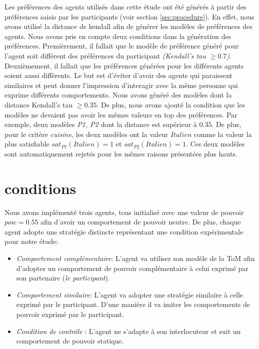 	Les préférences des agents utilisés dans cette étude ont été générés à partir des préférences saisis par les participants (voir section \ref{sec:procedure}). 
	En effet, nous avons utilisé la distance de kendall \cite{bra2013Kendall} afin de générer les modèles de préférences des agents. Nous avons pris en compte deux conditions dans la génération des préférences. Premièrement, il fallait que le modèle de préférence généré pour l'agent soit différent des préférences du participant \emph{(Kendall's tau $\geq 0.7$)}. Deuxièmement, il fallait que les préférences générées pour les différents agents soient aussi différents. 
	Le but est d'éviter d'avoir des agents qui paraissent similaires et peut donner l'impression d'interagir avec la même personne qui exprime différents comportements. Nous avons généré des modèles dont la distance Kendall's tau $\geq 0.35$. De plus, nous avons ajouté la condition que les modèles ne devaient pas avoir les mêmes valeurs en top des préférences. 
	Par exemple, deux modèles \emph{P1, P2} dont la distance est supérieur à $0.35$. De plus, pour le critère \textit{cuisine}, les deux modèles ont la valeur $Italien$ comme la valeur la plus satisfiable $sat_{P1}(Italien) = 1$ et $sat_{P2}(Italien) = 1$. Ces deux modèles sont automatiquement rejetés pour les mêmes raisons présentées plus hauts. 
	
	\section{conditions}
	
	Nous avons implémenté trois agents, tous initialisé avec une valeur de pouvoir $pow =0.55$ afin d'avoir un comportement de pouvoir neutre.
	De plus, chaque agent adopte une stratégie distincte représentant une condition expérimentale pour notre étude: 
	
	\begin{itemize}
		\item \textit{Comportement complémentaire}: L'agent va utiliser son modèle de la ToM afin d'adopter un comportement de pouvoir complémentaire à celui exprimé par son partenaire (\emph{le participant}).
		
		\item \textit{Comportement similaire}: L'agent va adopter une stratégie similaire à celle exprimé par le participant. D'une manière il va imiter les comportements de pouvoir exprimé par le participant.
		
		\item \textit{Condition de contrôle} : L'agent ne s'adapte à son interlocuteur et suit un comportement de pouvoir statique.
	\end{itemize}

